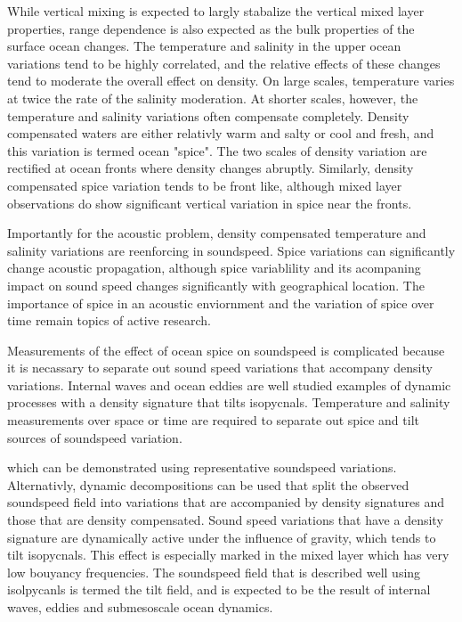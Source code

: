 \documentclass[preprint,NumberedRefs]{JASA}
\begin{document}
While vertical mixing is expected to largly stabalize the vertical mixed layer properties, range dependence is also expected as the bulk properties of the surface ocean changes\citep{ferrari2000}. The temperature and salinity in the upper ocean variations tend to be highly correlated, and the relative effects of these changes tend to moderate the overall effect on density. On large scales, temperature varies at twice the rate of the salinity moderation. At shorter scales, however, the temperature and salinity variations often compensate completely. Density compensated waters are either relativly warm and salty or cool and fresh, and this variation is termed ocean "spice". The two scales of density variation are rectified at ocean fronts where density changes abruptly. Similarly, density compensated spice variation tends to be front like, although mixed layer observations do show significant vertical variation in spice near the fronts.

Importantly for the acoustic problem, density compensated temperature and salinity variations are reenforcing in soundspeed. Spice variations can significantly change acoustic propagation, although spice variablility and its acompaning impact on sound speed changes significantly with geographical location\citep{colosi12,colosi13,murat2021}. The importance of spice in an acoustic enviornment and the variation of spice over time remain topics of active research.

Measurements of the effect of ocean spice on soundspeed is complicated because it is necassary to separate out sound speed variations that accompany density variations. Internal waves and ocean eddies are well studied examples of dynamic processes with a density signature that tilts isopycnals. Temperature and salinity measurements over space or time are required to separate out spice and tilt sources of soundspeed variation.

which can be demonstrated using representative soundspeed variations\citep{colosi21}. Alternativly, dynamic decompositions can be used that split the observed soundspeed field into variations that are accompanied by density signatures and those that are density compensated\citep{dzieciuch2004}. Sound speed variations that have a density signature are dynamically active under the influence of gravity, which tends to tilt isopycnals. This effect is especially marked in the mixed layer which has very low bouyancy frequencies. The soundspeed field that is described well using isolpycanls is termed the tilt field, and is expected to be the result of internal waves, eddies and submesoscale ocean dynamics.
\end{document}
